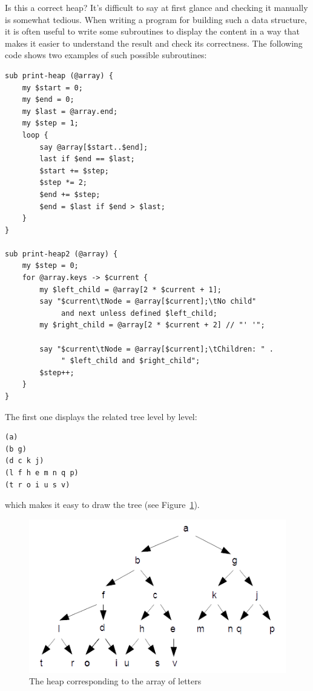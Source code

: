 Is this a correct heap? It's difficult to say at first 
glance and checking it manually is somewhat tedious. When 
writing a program for building such a data structure, 
it is often useful to write some subroutines to display 
the content in a way that makes it easier to understand 
the result and check its correctness. The following 
code shows two examples of such possible subroutines:
\begin{verbatim}
sub print-heap (@array) {
    my $start = 0;
    my $end = 0;
    my $last = @array.end;
    my $step = 1;
    loop {
        say @array[$start..$end];
        last if $end == $last;
        $start += $step;
        $step *= 2;
        $end += $step;
        $end = $last if $end > $last;
    } 
}

sub print-heap2 (@array) {
    my $step = 0;
    for @array.keys -> $current {
        my $left_child = @array[2 * $current + 1];
        say "$current\tNode = @array[$current];\tNo child" 
             and next unless defined $left_child;
        my $right_child = @array[2 * $current + 2] // "' '";
        
        say "$current\tNode = @array[$current];\tChildren: " . 
             " $left_child and $right_child";
        $step++;
    }
}
\end{verbatim}

The first one displays the related tree level by level:

\begin{verbatim}
(a)
(b g)
(d c k j)
(l f h e m n q p)
(t r o i u s v)
\end{verbatim}

which makes it easy to draw the tree (see Figure~\ref{fig.heap2}).

\begin{figure}
\centerline
{\includegraphics[scale=1]{figs/figure_heap2.png}}
\caption{The heap corresponding to the array of letters}
\label{fig.heap2}
\end{figure}


